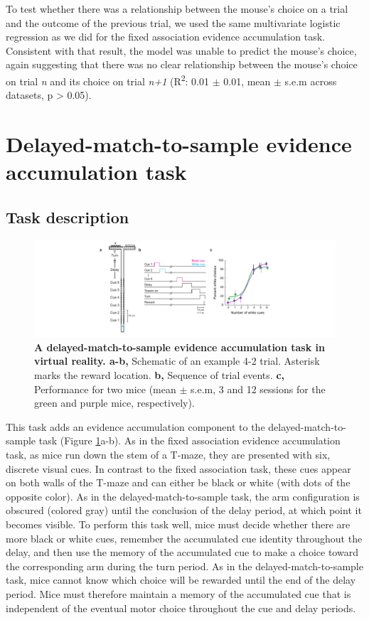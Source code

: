 \bigskip
To test whether there was a relationship between the mouse’s choice on a trial and the outcome of the previous trial, we used the same multivariate logistic regression as we did for the fixed association evidence accumulation task. Consistent with that result, the model was unable to predict the mouse’s choice, again suggesting that there was no clear relationship between the mouse’s choice on trial \textit{n} and its choice on trial \textit{n+1} (R\textsuperscript{2}: 0.01 $\pm$ 0.01, mean $\pm$ s.e.m across datasets, p > 0.05). 

\section{Delayed-match-to-sample evidence accumulation task}

\subsection{Task description}

\begin{figure}
\includegraphics[width=1.4\textwidth,center]{figures/fig_2_7.pdf}
\caption[A delayed-match-to-sample evidence accumulation task in virtual reality.]{\textbf{A delayed-match-to-sample evidence accumulation task in virtual reality. a-b,} Schematic of an example 4-2 trial. Asterisk marks the reward location.
%
\textbf{b,} Sequence of trial events. 
%
\textbf{c,} Performance for two mice (mean $\pm$ s.e.m, 3 and 12 sessions for the green and purple mice, respectively).
\label{fig:2_7}}
\end{figure}

This task adds an evidence accumulation component to the delayed-match-to-sample task (Figure \ref{fig:2_7}a-b). As in the fixed association evidence accumulation task, as mice run down the stem of a T-maze, they are presented with six, discrete visual cues. In contrast to the fixed association task, these cues appear on both walls of the T-maze and can either be black or white (with dots of the opposite color). As in the delayed-match-to-sample task, the arm configuration is obscured (colored gray) until the conclusion of the delay period, at which point it becomes visible. To perform this task well, mice must decide whether there are more black or white cues, remember the accumulated cue identity throughout the delay, and then use the memory of the accumulated cue to make a choice toward the corresponding arm during the turn period. As in the delayed-match-to-sample task, mice cannot know which choice will be rewarded until the end of the delay period. Mice must therefore maintain a memory of the accumulated cue that is independent of the eventual motor choice throughout the cue and delay periods. 

